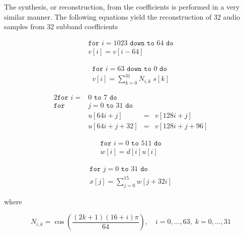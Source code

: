 \documentclass{article} %
\begin{document}
The synthesis, or reconstruction, from the coefficients is performed
in a very similar manner. The following equations yield the reconstruction
of 32 audio samples from 32 subband coefficients

\begin{align}
\label{eq:vshift}
\texttt{for } i=1023 \texttt{ down to } 64 \texttt{ do}\nonumber \\
v[i]=v[i-64]
\end{align}

\begin{align}
\label{eq:Nisk}
\texttt{for } i=63 \texttt{ down to } 0 \texttt{ do} \nonumber \\
v[i]=\sum\limits_{k=0}^{31} N_{i,k} \; s[k]
\end{align}

\begin{alignat}{2}
\texttt{for } i=&0 \texttt{ to } 7 \texttt{ do} \nonumber \\
\texttt{for } &j=0 \texttt{ to } 31 \texttt{ do} \nonumber \\
& u[64i+j] &=&v[128i+j] \label{eq:ushift1}\\
& u[64i+j+32] &= &v[128i+j+96]\label{eq:ushift2} 
\end{alignat}


\begin{align}
\texttt{for } i=0 \texttt{ to } 511 \texttt{ do} \nonumber \\
w[i]=d[i] u[i] \label{eq:wi}
\end{align}

\begin{align}
\texttt{for } j=0 \texttt{ to } 31 \texttt{ do} \nonumber \\
x[j]=\sum\limits_{j=0}^{15} w[j+32i] \label{eq:xj}
\end{align}

where

\begin{equation}
\label{eq:nik}
\boxed{
N_{i,k}=\cos \left( \frac{(2k+1)(16+i)\pi}{64}\right), 
\quad i=0,\dots,63, \; k=0,\dots,31
}
\end{equation}

% 





\end{document}
